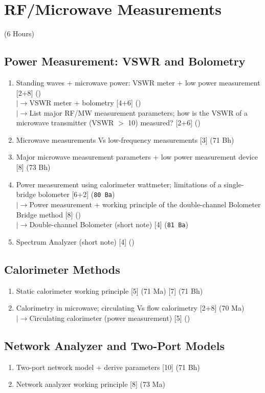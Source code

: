 \documentclass[12pt]{article}
\newcommand{\lb}{\\$\left|\rightarrow\right.$}
\begin{document}
\section{RF/Microwave Measurements}
\begin{center}(6 Hours)\end{center}

  \subsection{Power Measurement: VSWR and Bolometry}
    \begin{enumerate}[topsep=0pt, noitemsep]
      \item Standing waves + microwave power: VSWR meter + low power measurement \hfill [2+8] ()
        \lb VSWR meter + bolometry \hfill [4+6] ()
        \lb List major RF/MW measurement parameters; how is the VSWR of a microwave transmitter (VSWR $>$ 10) measured? \hfill [2+6] ()
      \item Microwave measurements Vs low-frequency measurements \hfill [3] (71 Bh)
      \item Major microwave measurement parameters + low power measurement device \hfill [8] (73 Bh)
      \item Power measurement using calorimeter wattmeter; limitations of a single-bridge bolometer \hfill [6+2] (\texttt{80 Ba})
        \lb Power measurement + working principle of the double-channel Bolometer Bridge method \hfill [8] ()
        \lb Double-channel Bolometer (short note) \hfill [4] (\texttt{81 Ba})
      \item Spectrum Analyzer (short note) \hfill [4] ()
    \end{enumerate}

  \subsection{Calorimeter Methods}
    \begin{enumerate}[topsep=0pt, noitemsep]
      \item Static calorimeter working principle \hfill [5] (71 Ma) [7] (71 Bh)
      \item Calorimetry in microwave; circulating Vs flow calorimetry \hfill [2+8] (70 Ma)
        \lb Circulating calorimeter (power measurement) \hfill [5] ()
    \end{enumerate}

  \subsection{Network Analyzer and Two-Port Models}
    \begin{enumerate}[topsep=0pt, noitemsep]
      \item Two-port network model + derive parameters \hfill [10] (71 Bh)
      \item Network analyzer working principle \hfill [8] (73 Ma)
    \end{enumerate}
\end{document}
